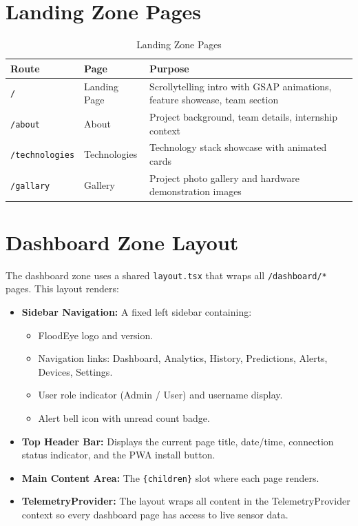 \section{Landing Zone Pages}

\begin{table}[H]
\centering
\caption{Landing Zone Pages}
\begin{tabularx}{\linewidth}{|l|l|X|}
\hline
\rowcolor{FloodLight}
\textbf{Route} & \textbf{Page} & \textbf{Purpose} \\
\hline
\texttt{/\allowbreak{}} & Landing Page & Scrollytelling intro with GSAP animations, feature showcase, team section \\
\hline
\texttt{/\allowbreak{}about} & About & Project background, team details, internship context \\
\hline
\texttt{/\allowbreak{}technologies} & Technologies & Technology stack showcase with animated cards \\
\hline
\texttt{/\allowbreak{}gallary} & Gallery & Project photo gallery and hardware demonstration images \\
\hline
\end{tabularx}
\end{table}

\section{Dashboard Zone Layout}

The dashboard zone uses a shared \texttt{layout.\allowbreak{}tsx} that wraps all \texttt{/\allowbreak{}dashboard/\allowbreak{}*} pages. This layout renders:

\begin{itemize}[leftmargin=1.5em]
  \item \textbf{Sidebar Navigation:} A fixed left sidebar containing:
    \begin{itemize}
      \item FloodEye logo and version.
      \item Navigation links: Dashboard, Analytics, History, Predictions, Alerts, Devices, Settings.
      \item User role indicator (Admin / User) and username display.
      \item Alert bell icon with unread count badge.
    \end{itemize}
  \item \textbf{Top Header Bar:} Displays the current page title, date/time, connection status indicator, and the PWA install button.
  \item \textbf{Main Content Area:} The \texttt{\{children\}} slot where each page renders.
  \item \textbf{TelemetryProvider:} The layout wraps all content in the TelemetryProvider context so every dashboard page has access to live sensor data.
\end{itemize}

